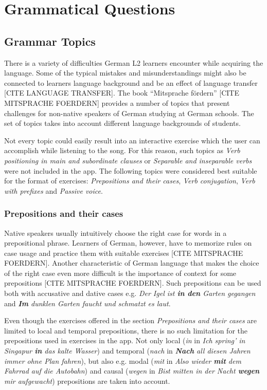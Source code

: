 \chapter{Grammatical Questions}
\label{sec:grammar}

\section{Grammar Topics}
\label{sec:topics}

There is a variety of difficulties German L2 learners encounter while acquiring the language. Some of the typical mistakes and misunderstandings might also be connected to learners language background and be an effect of language transfer [CITE LANGUAGE TRANSFER]. The book ``Mitsprache fördern'' [CITE MITSPRACHE FOERDERN] provides a number of topics that present challenges for non-native speakers of German studying at German schools. The set of topics takes into account different language backgrounds of students.

Not every topic could easily result into an interactive exercise which the user can accomplish while listening to the song. For this reason, such topics as \textit{Verb positioning in main and subordinate clauses} or \textit{Separable and inseparable verbs} were not included in the app. The following topics were considered best suitable for the format of exercises: \textit{Prepositions and their cases}, \textit{Verb conjugation}, \textit{Verb with prefixes} and \textit{Passive voice}.

\subsection{Prepositions and their cases}

Native speakers usually intuitively choose the right case for words in a prepositional phrase. Learners of German, however, have to memorize rules on case usage and practice them with suitable exercises [CITE MITSPRACHE FOERDERN]. Another characteristic of German language that makes the choice of the right case even more difficult is the importance of context for some prepositions [CITE MITSPRACHE FOERDERN]. Such prepositions can be used both with accusative and dative cases e.g. \textit{Der Igel ist \textbf{in den} Garten gegangen} and \textit{\textbf{Im} dunklen Garten faucht und schmatzt es laut}.

Even though the exercises offered in the section \textit{Prepositions and their cases} are limited to local and temporal prepositions, there is no such limitation for the prepositions used in exercises in the app. Not only local (\textit{in} in \textit{Ich spring' in Singapur \textbf{in} das kalte Wasser}) and temporal (\textit{nach} in \textit{\textbf{Nach} all diesen Jahren immer ohne Plan fahren}), but also e.g. modal (\textit{mit} in \textit{Also wieder \textbf{mit} dem Fahrrad auf die Autobahn}) and causal (\textit{wegen} in \textit{Bist mitten in der Nacht \textbf{wegen} mir aufgewacht}) prepositions are taken into account. 

